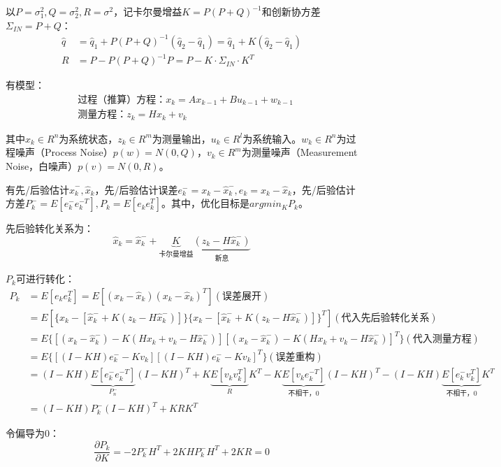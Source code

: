 \documentclass[
12pt, %
a4paper, 
oneside, %
headinclude,footinclude, %
]{scrartcl}
\begin{document}
以$ P = \sigma_1^2, Q = \sigma_2^2, R = \sigma^2 $，记卡尔曼增益$ K = P(P + Q)^{-1} $和创新协方差$ \Sigma_{IN} = P + Q $：
\begin{align*}
\hat{q} &= \hat{q}_1 + P(P + Q)^{-1}(\hat{q}_2 - \hat{q}_1) = \hat{q}_1 + K(\hat{q}_2 - \hat{q}_1) \\
R &= P - P(P + Q)^{-1}P = P - K \cdot \Sigma_{IN} \cdot K^T
\end{align*}

有模型：
\begin{align*}
&\text{过程（推算）方程：}x_k = A x_{k - 1} + B u_{k - 1} + w_{k - 1} \\
&\text{测量方程：}z_k = H x_k + v_k
\end{align*}

其中$ x_k \in R^n $为系统状态，$ z_k \in R^m $为测量输出，$ u_k \in R^l $为系统输入。$ w_k \in R^n $为过程噪声（Process Noise）$ p(w) = N(0, Q) $，$ v_k \in R^m $为测量噪声（Measurement Noise，白噪声）$ p(v) = N(0, R) $。

有先/后验估计$ \hat{x}_k^-, \hat{x}_k $，先/后验估计误差$ e_k^- = x_k - \hat{x}_k^-, e_k = x_k - \hat{x}_k $，先/后验估计方差$ P_k^- = E[e_k^- e_k^{-T}], P_k = E[e_k e_k^T] $。其中，优化目标是$ argmin_K P_k $。

先后验转化关系为：
$$ \hat{x}_k = \hat{x}_k^- + \underbrace{K}_{\text{卡尔曼增益}}\underbrace{(z_k - H \hat{x}_k^-)}_{\text{新息}} $$

$ P_k $可进行转化：
\begin{align*}
P_k &= E[e_k e_k^T] = E[(x_k - \hat{x}_k)(x_k - \hat{x}_k)^T] (\text{误差展开}) \\
&= E[\{x_k - [\hat{x}_k^- + K(z_k - H \hat{x}_k^-)]\} \{x_k - [\hat{x}_k^- + K(z_k - H \hat{x}_k^-)]\}^T] (\text{代入先后验转化关系}) \\
&= E\{[(x_k - \hat{x}_k^-) - K(H x_k + v_k - H \hat{x}_k^-)][(x_k - \hat{x}_k^-) - K(H x_k + v_k - H \hat{x}_k^-)]^T\} (\text{代入测量方程}) \\
&= E\{[(I - KH)e_k^- - Kv_k][(I - KH)e_k^- - K v_k]^T\} (\text{误差重构}) \\
&= (I - KH) \underbrace{E[e_k^- e_k^{-T}]}_{P_n^-} (I - KH)^T + K \underbrace{E[v_k v_k^T]}_{R} K^T - K \underbrace{E[v_k e_k^{-T}]}_{\text{不相干，}0} (I - KH)^T -(I - KH) \underbrace{E[e_k^- v_k^T]}_{\text{不相干，}0} K^T \\
&= (I - KH)P_k^-(I - KH)^T + K R K^T
\end{align*}

令偏导为$ 0 $：
$$ \frac{\partial P_k}{\partial K} = -2P_k^- H^T + 2K H P_k^- H^T + 2KR = 0 $$
\end{document}
